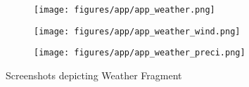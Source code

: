 \begin{figure}[!ht]
    \centering

    \begin{subfigure}{0.25\textwidth}
        \centering
        \texttt{[image: figures/app/app\_weather.png]}
    \end{subfigure}
    \begin{subfigure}{0.25\textwidth}
        \centering
        \texttt{[image: figures/app/app\_weather\_wind.png]}
        
        \vspace{\baselineskip}
        \vspace{\baselineskip}

        \texttt{[image: figures/app/app\_weather\_preci.png]}
    \end{subfigure}


    
    \caption{Screenshots depicting Weather Fragment}
    \label{fig:app_weather}
\end{figure}